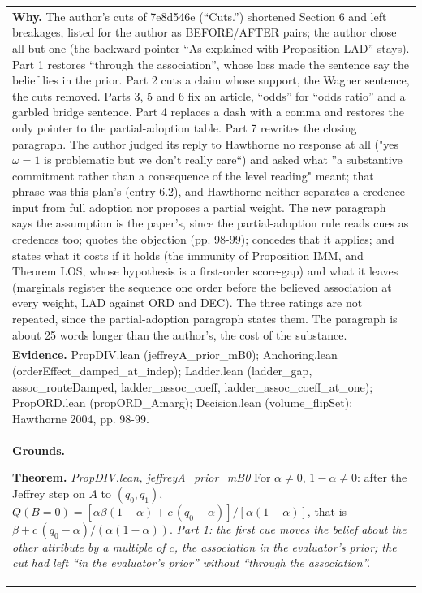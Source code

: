 \documentclass[10pt]{article}
\theoremstyle{definition}
\newlength{\fullw}\setlength{\fullw}{25.9cm}
\begin{document}
{\begin{longtable}{|p{0.9cm}|p{12.2cm}|p{12.2cm}|}
\multicolumn{3}{|p{\fullw}|}{\textbf{Why.} The author's cuts of 7e8d546e (``Cuts.'') shortened Section 6 and left breakages, listed for the author as BEFORE/AFTER pairs; the author chose all but one (the backward pointer ``As explained with Proposition LAD'' stays). Part 1 restores ``through the association'', whose loss made the sentence say the belief lies in the prior. Part 2 cuts a claim whose support, the Wagner sentence, the cuts removed. Parts 3, 5 and 6 fix an article, ``odds'' for ``odds ratio'' and a garbled bridge sentence. Part 4 replaces a dash with a comma and restores the only pointer to the partial-adoption table. Part 7 rewrites the closing paragraph. The author judged its reply to Hawthorne no response at all ("yes $\omega=1$ is problematic but we don't really care``) and asked what ''a substantive commitment rather than a consequence of the level reading" meant; that phrase was this plan's (entry 6.2), and Hawthorne neither separates a credence input from full adoption nor proposes a partial weight. The new paragraph says the assumption is the paper's, since the partial-adoption rule reads cues as credences too; quotes the objection (pp. 98-99); concedes that it applies; and states what it costs if it holds (the immunity of Proposition IMM, and Theorem LOS, whose hypothesis is a first-order score-gap) and what it leaves (marginals register the sequence one order before the believed association at every weight, LAD against ORD and DEC). The three ratings are not repeated, since the partial-adoption paragraph states them. The paragraph is about 25 words longer than the author's, the cost of the substance.} \\
\multicolumn{3}{|p{\fullw}|}{\textbf{Evidence.} PropDIV.lean (jeffreyA\_prior\_mB0); Anchoring.lean (orderEffect\_damped\_at\_indep); Ladder.lean (ladder\_gap, assoc\_routeDamped, ladder\_assoc\_coeff, ladder\_assoc\_coeff\_at\_one); PropORD.lean (propORD\_Amarg); Decision.lean (volume\_flipSet); Hawthorne 2004, pp. 98-99.} \\ \hline
\multicolumn{3}{|p{\fullw}|}{\textbf{Grounds.}\par \textbf{Theorem.} \textit{PropDIV.lean, jeffreyA\_prior\_mB0} \newline For $\alpha\neq0$, $1-\alpha\neq0$: after the Jeffrey step on $A$ to $(q_0,q_1)$,
$Q(B{=}0)=[\alpha\beta(1-\alpha)+c\,(q_0-\alpha)]/[\alpha(1-\alpha)]$, that is
$\beta+c\,(q_0-\alpha)/(\alpha(1-\alpha))$. \newline \textit{Part 1: the first cue moves the belief about the other attribute by a multiple of $c$, the association in the evaluator's prior; the cut had left ``in the evaluator's prior'' without ``through the association''.}} \\

\end{longtable}}
\end{document}
